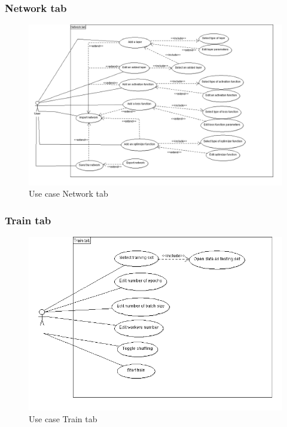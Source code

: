    \subsubsection{Network tab}
    \begin{figure}[htbp]
        \centering 
        \includegraphics[width=\textwidth]{figures/dcuNetwork.png}
        \caption{Use case Network tab}
    \end{figure}

\pagebreak
    
    \subsubsection{Train tab}
    \begin{figure}[htbp]
        \centering 
        \includegraphics[width=\textwidth]{figures/dcuTrain.png}
        \caption{Use case Train tab}
    \end{figure}

